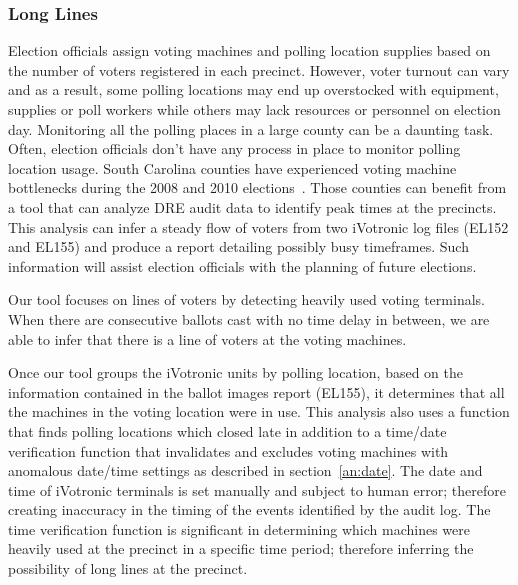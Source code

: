 \subsubsection{Long Lines}
Election officials assign voting machines and polling location supplies based on the number of voters registered in each precinct.  However, voter turnout can vary and as a result, some polling locations may end up overstocked with equipment, supplies or poll workers while others may lack resources or personnel on election day. Monitoring all the polling places in a large county can be a daunting task. Often, election officials don't have any process in place to monitor polling location usage. South Carolina counties have experienced voting machine bottlenecks during the 2008 and 2010 elections~\cite{Kreitman2010, Slade2008, U2010}.  Those counties can benefit from a tool that can analyze DRE audit data to identify peak times at the precincts.  This analysis can infer a steady flow of voters from two iVotronic log files (EL152 and EL155) and produce a report detailing possibly busy timeframes. Such information will assist election officials with the planning of future elections.

Our tool focuses on lines of voters by detecting heavily used voting terminals. When there are consecutive ballots cast with no time delay in between, we are able to infer that there is a line of voters at the voting machines. 

Once our tool groups the iVotronic units by polling location, based on the information contained in the ballot images report (EL155), it determines that all the machines in the voting location were in use. This analysis also uses a function that finds polling locations which closed late in addition to a time/date verification function that invalidates and excludes voting machines with anomalous date/time settings as described in section~\ref{an:date}. The date and time of iVotronic terminals is set manually and subject to human error; therefore creating inaccuracy in the timing of the events identified by the audit log.  The time verification function is significant in determining which machines were heavily used at the precinct in a specific time period; therefore inferring the possibility of long lines at the precinct.

